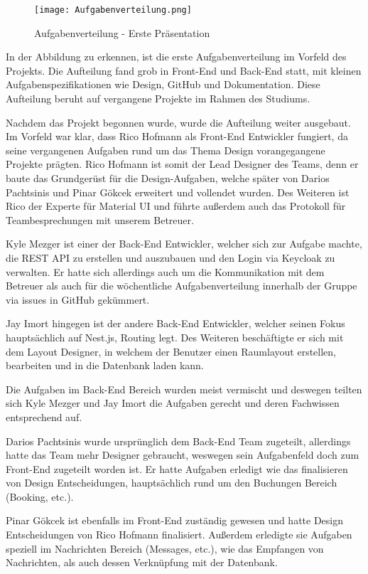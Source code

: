 \begin{figure}[!h]
    \centering
    \texttt{[image: Aufgabenverteilung.png]}
    \caption{Aufgabenverteilung - Erste Präsentation}
    \label{fig:Aufgabenverteilung}
\end{figure}

In der Abbildung zu erkennen, ist die erste Aufgabenverteilung im Vorfeld des Projekts.
Die Aufteilung fand grob in Front-End und Back-End statt, mit kleinen Aufgabenspezifikationen wie Design, GitHub und Dokumentation.
Diese Aufteilung beruht auf vergangene Projekte im Rahmen des Studiums.

Nachdem das Projekt begonnen wurde, wurde die Aufteilung weiter ausgebaut.
Im Vorfeld war klar, dass Rico Hofmann als Front-End Entwickler fungiert, da seine vergangenen Aufgaben rund um das Thema Design vorangegangene Projekte prägten.
Rico Hofmann ist somit der Lead Designer des Teams, denn er baute das Grundgerüst für die Design-Aufgaben, welche später von Darios Pachtsinis und Pinar Gökcek erweitert und vollendet wurden.
Des Weiteren ist Rico der Experte für Material UI und führte außerdem auch das Protokoll für Teambesprechungen mit unserem Betreuer.

Kyle Mezger ist einer der Back-End Entwickler, welcher sich zur Aufgabe machte, die REST API zu erstellen und auszubauen und den Login via Keycloak zu verwalten.
Er hatte sich allerdings auch um die Kommunikation mit dem Betreuer als auch für die wöchentliche Aufgabenverteilung innerhalb der Gruppe via issues in GitHub gekümmert.

Jay Imort hingegen ist der andere Back-End Entwickler, welcher seinen Fokus hauptsächlich auf Nest.js, Routing legt.
Des Weiteren beschäftigte er sich mit dem Layout Designer, in welchem der Benutzer einen Raumlayout erstellen, bearbeiten und in die Datenbank laden kann.

Die Aufgaben im Back-End Bereich wurden meist vermischt und deswegen teilten sich Kyle Mezger und Jay Imort die Aufgaben gerecht und deren Fachwissen entsprechend auf.

Darios Pachtsinis wurde ursprünglich dem Back-End Team zugeteilt, allerdings hatte das Team mehr Designer gebraucht, weswegen sein Aufgabenfeld doch zum Front-End zugeteilt worden ist.
Er hatte Aufgaben erledigt wie das finalisieren von Design Entscheidungen, hauptsächlich rund um den Buchungen Bereich (Booking, etc.).

Pinar Gökcek ist ebenfalls im Front-End zuständig gewesen und hatte Design Entscheidungen von Rico Hofmann finalisiert.
Außerdem erledigte sie Aufgaben speziell im Nachrichten Bereich (Messages, etc.), wie das Empfangen von Nachrichten, als auch dessen Verknüpfung mit der Datenbank.

